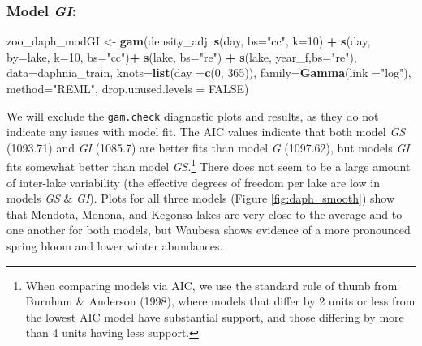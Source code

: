 \documentclass[12pt]{article}
\newenvironment{Shaded}{\begin{snugshade}}{\end{snugshade}}
\newcommand{\KeywordTok}[1]{\textcolor[rgb]{0.13,0.29,0.53}{\textbf{#1}}}
\newcommand{\DataTypeTok}[1]{\textcolor[rgb]{0.13,0.29,0.53}{#1}}
\newcommand{\DecValTok}[1]{\textcolor[rgb]{0.00,0.00,0.81}{#1}}
\newcommand{\StringTok}[1]{\textcolor[rgb]{0.31,0.60,0.02}{#1}}
\newcommand{\OtherTok}[1]{\textcolor[rgb]{0.56,0.35,0.01}{#1}}
\newcommand{\OperatorTok}[1]{\textcolor[rgb]{0.81,0.36,0.00}{\textbf{#1}}}
\newcommand{\NormalTok}[1]{#1}
\let\rmarkdownfootnote\footnote%
\def\footnote{\protect\rmarkdownfootnote}
\begin{document}
\subsubsection{\texorpdfstring{Model
\emph{GI}:}{Model GI:}}\label{model-gi}

\begin{Shaded}
\begin{Highlighting}[]
\NormalTok{zoo_daph_modGI <-}\StringTok{ }\KeywordTok{gam}\NormalTok{(density_adj}\OperatorTok{~}\KeywordTok{s}\NormalTok{(day, }\DataTypeTok{bs=}\StringTok{"cc"}\NormalTok{, }\DataTypeTok{k=}\DecValTok{10}\NormalTok{) }\OperatorTok{+}
\StringTok{                             }\KeywordTok{s}\NormalTok{(day, }\DataTypeTok{by=}\NormalTok{lake, }\DataTypeTok{k=}\DecValTok{10}\NormalTok{, }\DataTypeTok{bs=}\StringTok{"cc"}\NormalTok{)}\OperatorTok{+}
\StringTok{                             }\KeywordTok{s}\NormalTok{(lake, }\DataTypeTok{bs=}\StringTok{"re"}\NormalTok{) }\OperatorTok{+}\StringTok{ }
\StringTok{                             }\KeywordTok{s}\NormalTok{(lake, year_f,}\DataTypeTok{bs=}\StringTok{"re"}\NormalTok{),}
                     \DataTypeTok{data=}\NormalTok{daphnia_train,}
                     \DataTypeTok{knots=}\KeywordTok{list}\NormalTok{(}\DataTypeTok{day =}\KeywordTok{c}\NormalTok{(}\DecValTok{0}\NormalTok{, }\DecValTok{365}\NormalTok{)),}
                     \DataTypeTok{family=}\KeywordTok{Gamma}\NormalTok{(}\DataTypeTok{link =}\StringTok{"log"}\NormalTok{),}
                     \DataTypeTok{method=}\StringTok{"REML"}\NormalTok{,}
                     \DataTypeTok{drop.unused.levels =} \OtherTok{FALSE}\NormalTok{)}
\end{Highlighting}
\end{Shaded}

We will exclude the \texttt{gam.check} diagnostic plots and results, as
they do not indicate any issues with model fit. The AIC values indicate
that both model \emph{GS} (1093.71) and \emph{GI} (1085.7) are better
fits than model \emph{G} (1097.62), but models \emph{GI} fits somewhat
better than model \emph{GS}.\footnote{When comparing models via AIC, we
  use the standard rule of thumb from Burnham \& Anderson (1998), where
  models that differ by 2 units or less from the lowest AIC model have
  substantial support, and those differing by more than 4 units having
  less support.} There does not seem to be a large amount of inter-lake
variability (the effective degrees of freedom per lake are low in models
\emph{GS} \& \emph{GI}). Plots for all three models (Figure
\ref{fig:daph_smooth}) show that Mendota, Monona, and Kegonsa lakes are
very close to the average and to one another for both models, but
Waubesa shows evidence of a more pronounced spring bloom and lower
winter abundances.
\end{document}
